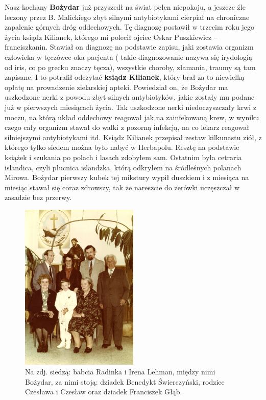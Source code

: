 Nasz kochany \textbf{Bożydar} już przyszedł na świat pełen niepokoju, a jeszcze źle leczony przez B. Malickiego zbyt silnymi antybiotykami cierpiał na chroniczne zapalenie górnych dróg oddechowych. Tę diagnozę postawił w trzecim roku jego życia ksiądz Kilianek, którego mi polecił ojciec Oskar Puszkiewicz – franciszkanin. Stawiał on diagnozę na podstawie zapisu, jaki zostawia organizm człowieka w tęczówce oka pacjenta ( takie diagnozowanie nazywa się irydologią od iris, co po grecku znaczy tęcza), wszystkie choroby, złamania, traumy są tam zapisane. I to potrafił odczytać \textbf{ksiądz Kilianek}, który brał za to niewielką opłatę na prowadzenie zielarskiej apteki. Powiedział on, że Bożydar ma uszkodzone nerki z powodu zbyt silnych antybiotyków, jakie zostały mu podane już w pierwszych miesiącach życia. Tak uszkodzone nerki niedoczyszczały krwi z moczu, na którą układ oddechowy reagował jak na zainfekowaną krew, w wyniku czego cały organizm stawał do walki z pozorną infekcją, na co lekarz reagował silniejszymi antybiotykami itd. Ksiądz Kilianek przepisał zestaw  kilkunastu ziół, z którego tylko siedem można było nabyć w Herbapolu. Resztę na podstawie książek i szukania po polach i lasach zdobyłem sam. Ostatnim była cetraria islandica, czyli płucnica islandzka, którą odkryłem na śródleśnych polanach Mirowa. Bożydar pierwszy kubek tej mikstury wypił duszkiem i z miesiąca na miesiąc stawał się coraz zdrowszy, tak że nareszcie do zerówki uczęszczał w zasadzie bez przerwy.
\begin{figure}[!h]
\begin{center}
\includegraphics[width=0.5\textwidth]{photo/bozydar_swierczynski_komunia.jpg}
\caption[I Komunia św. Bożydara z dziadkami]{Na zdj. siedzą: babcia Radinka i Irena Lehman, między nimi Bożydar, za nimi stoją: dziadek Benedykt Świerczyński, rodzice Czesława i Czesław oraz dziadek Franciszek Głąb.}
\end{center}
\end{figure}

